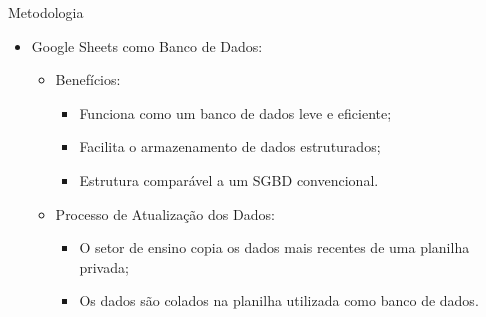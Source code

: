 \begin{frame}{Metodologia}
    \begin{itemize}
        \item Google Sheets como Banco de Dados: \vspace{0.25cm}
              \begin{itemize}
                  \item Benefícios: \vspace{0.25cm}
                        \begin{itemize}
                            \item Funciona como um banco de dados leve e eficiente; \vspace{0.25cm}
                            \item Facilita o armazenamento de dados estruturados; \vspace{0.25cm}
                            \item Estrutura comparável a um SGBD convencional. \vspace{0.25cm}
                        \end{itemize}
                  \item Processo de Atualização dos Dados: \vspace{0.25cm}
                        \begin{itemize}
                            \item O setor de ensino copia os dados mais recentes de uma planilha privada; \vspace{0.25cm}
                            \item Os dados são colados na planilha utilizada como banco de dados. \vspace{0.25cm}
                        \end{itemize}
              \end{itemize}
    \end{itemize}
\end{frame}

